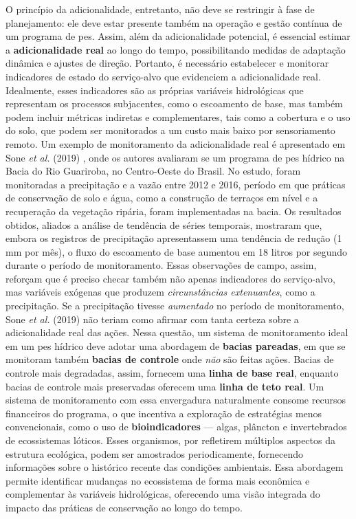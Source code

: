 \documentclass[./main.tex]{subfiles}
\begin{document}
\par O princípio da adicionalidade, entretanto, não deve se restringir à fase de planejamento: ele deve estar presente também na operação e gestão contínua de um programa de \acrshort{pes}. Assim, além da adicionalidade potencial, é essencial estimar a \textbf{adicionalidade real} ao longo do tempo, possibilitando medidas de adaptação dinâmica e ajustes de direção. Portanto, é necessário estabelecer e monitorar indicadores de estado do serviço-alvo que evidenciem a adicionalidade real. Idealmente, esses indicadores são as próprias variáveis hidrológicas que representam os processos subjacentes, como o escoamento de base, mas também podem incluir métricas indiretas e complementares, tais como a cobertura e o uso do solo, que podem ser monitorados a um custo mais baixo por sensoriamento remoto. Um exemplo de monitoramento da adicionalidade real é apresentado em Sone \textit{et al.} (2019) \cite{Sone2019a}, onde os autores avaliaram se um programa de \acrshort{pes} hídrico na Bacia do Rio Guariroba, no Centro-Oeste do Brasil. No estudo, foram monitoradas a precipitação e a vazão entre 2012 e 2016, período em que práticas de conservação de solo e água, como a construção de terraços em nível e a recuperação da vegetação ripária, foram implementadas na bacia. Os resultados obtidos, aliados a análise de tendência de séries temporais, mostraram que, embora os registros de precipitação apresentassem uma tendência de redução (1 mm por mês), o fluxo do escoamento de base aumentou em 18 litros por segundo durante o período de monitoramento. Essas observações de campo, assim, reforçam que é preciso checar também não apenas indicadores do serviço-alvo, mas variáveis exógenas que produzem \textit{circunstâncias extenuantes}, como a precipitação. Se a precipitação tivesse \textit{aumentado} no período de monitoramento, Sone \textit{et al.} (2019) não teriam como afirmar com tanta certeza sobre a adicionalidade real das ações. Nessa questão, um sistema de monitoramento ideal em um \acrshort{pes} hídrico deve adotar uma abordagem de \textbf{bacias pareadas}, em que se monitoram também \textbf{bacias de controle} onde \textit{não} são feitas ações. Bacias de controle mais degradadas, assim, fornecem uma \textbf{linha de base real}, enquanto bacias de controle mais preservadas oferecem uma \textbf{linha de teto real}. Um sistema de monitoramento com essa envergadura naturalmente consome recursos financeiros do programa, o que incentiva a exploração de estratégias menos convencionais, como o uso de \textbf{bioindicadores} — algas, plâncton e invertebrados de ecossistemas lóticos. Esses organismos, por refletirem múltiplos aspectos da estrutura ecológica, podem ser amostrados periodicamente, fornecendo informações sobre o histórico recente das condições ambientais. Essa abordagem permite identificar mudanças no ecossistema de forma mais econômica e complementar às variáveis hidrológicas, oferecendo uma visão integrada do impacto das práticas de conservação ao longo do tempo. 
\end{document}

